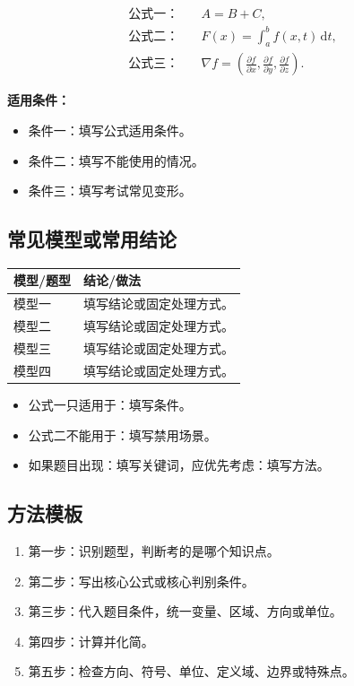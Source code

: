 \documentclass[UTF8,zihao=-4]{ctexart}
\newcommand{\dd}{\,\mathrm d}
\newcommand{\grad}{\nabla}
\begin{document}
\begin{keybox}[核心公式]
\begin{align*}
\text{公式一：}\quad & A = B + C, \\
\text{公式二：}\quad & F(x)=\int_a^b f(x,t)\dd t, \\
\text{公式三：}\quad & \grad f = \left(\frac{\partial f}{\partial x},\frac{\partial f}{\partial y},\frac{\partial f}{\partial z}\right).
\end{align*}

\textbf{适用条件：}
\begin{itemize}
  \item 条件一：填写公式适用条件。
  \item 条件二：填写不能使用的情况。
  \item 条件三：填写考试常见变形。
\end{itemize}
\end{keybox}

\subsection{常见模型或常用结论}

\begin{longtable}{p{}p{}}
\toprule
\textbf{模型/题型} & \textbf{结论/做法} \\
\midrule
模型一 & 填写结论或固定处理方式。 \\
模型二 & 填写结论或固定处理方式。 \\
模型三 & 填写结论或固定处理方式。 \\
模型四 & 填写结论或固定处理方式。 \\
\bottomrule
\end{longtable}

\begin{warnbox}[结论公式必须看适用条件]
\begin{itemize}
  \item 公式一只适用于：填写条件。
  \item 公式二不能用于：填写禁用场景。
  \item 如果题目出现：填写关键词，应优先考虑：填写方法。
\end{itemize}
\end{warnbox}

\subsection{方法模板}

\begin{methodbox}
\begin{enumerate}
  \item 第一步：识别题型，判断考的是哪个知识点。
  \item 第二步：写出核心公式或核心判别条件。
  \item 第三步：代入题目条件，统一变量、区域、方向或单位。
  \item 第四步：计算并化简。
  \item 第五步：检查方向、符号、单位、定义域、边界或特殊点。
\end{enumerate}
\end{methodbox}
\end{document}

